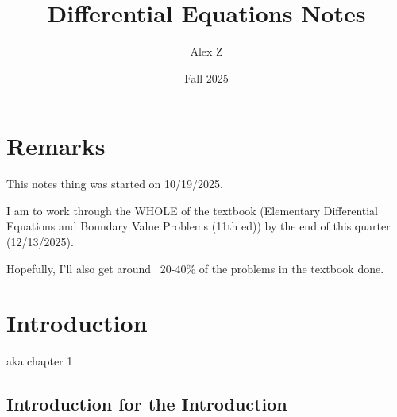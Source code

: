 \documentclass{article}
\title{Differential Equations Notes}
\author{Alex Z}
\date{Fall 2025}
\theoremstyle{definition}
\begin{document}
\maketitle
\newpage

\tableofcontents
\newpage


\section*{Remarks}

This notes thing was started on 10/19/2025.

I am to work through the WHOLE of the textbook (Elementary Differential Equations and Boundary Value Problems (11th ed)) by the end of this quarter (12/13/2025).

Hopefully, I'll also get around ~20-40\% of the problems in the textbook done.

\newpage

\section{Introduction}

aka chapter 1

\subsection{Introduction for the Introduction}
 
\end{document}
